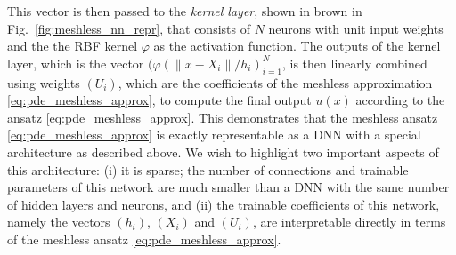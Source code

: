 \documentclass[12pt]{article}
\begin{document}
This vector is then passed to the \emph{kernel layer}, shown in brown in Fig.~\ref{fig:meshless_nn_repr}, that consists of $N$ neurons with unit input weights and the the RBF kernel $\varphi$ as the activation function. The outputs of the kernel layer, which is the vector $(\varphi(\lVert x - X_i\rVert/h_i)_{i=1}^N$, is then linearly combined using weights $(U_i)$, which are the coefficients of the meshless approximation \eqref{eq:pde_meshless_approx}, to compute the final output $u(x)$ according to the ansatz \eqref{eq:pde_meshless_approx}. This demonstrates that the meshless ansatz \eqref{eq:pde_meshless_approx} is exactly representable as a DNN with a special architecture as described above. We wish to highlight two important aspects of this architecture: (i) it is sparse; the number of connections and trainable parameters of this network are much smaller than a DNN with the same number of hidden layers and neurons, and (ii) the trainable coefficients of this network, namely the vectors $(h_i)$, $(X_i)$ and $(U_i)$, are interpretable directly in terms of the meshless ansatz \eqref{eq:pde_meshless_approx}.


\end{document}
